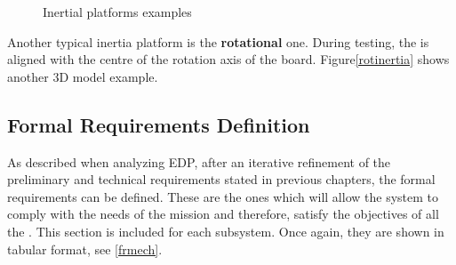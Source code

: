 			\begin{figure}[H]
			\centering
			 \quad
			\caption{Inertial platforms examples} 
\end{figure}


		
		

Another typical inertia platform is the \textbf{rotational} one. During testing, the  is aligned with the centre of the rotation axis of the board. Figure\autoref{rotinertia} shows another 3D model example.



\subsection{Formal Requirements Definition}

As described when analyzing \acrshort{EDP}, after an iterative refinement of the preliminary and technical requirements stated in previous chapters, the formal requirements can be defined. These are the ones which will allow the system to comply with the needs of the mission and therefore, satisfy the objectives of all the . This section is included for each subsystem. Once again, they are shown in tabular format, see \autoref{frmech}.

